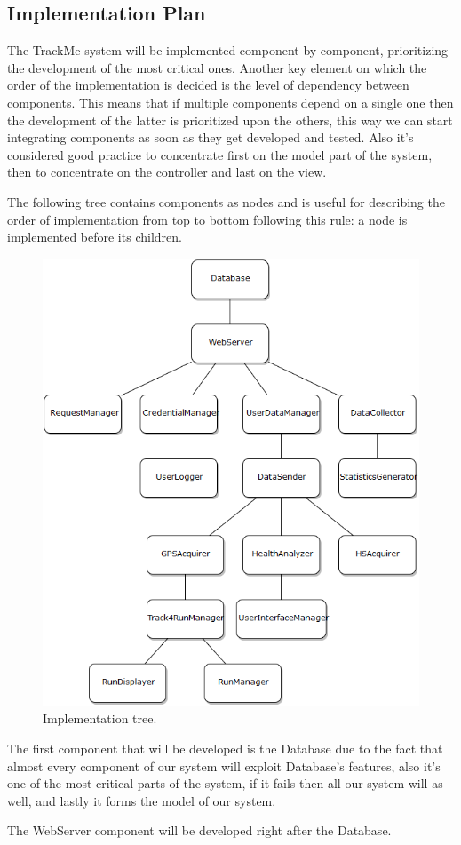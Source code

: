 \subsection{Implementation Plan}
The TrackMe system will be implemented component by component, prioritizing the development of the most critical ones. Another key element on which the order of the implementation is decided is the level of dependency between components. This means that if multiple components depend on a single one then the development of the latter is prioritized upon the others, this way we can start integrating components as soon as they get developed and tested. Also it's considered good practice to concentrate first on the model part of the system, then to concentrate on the controller and last on the view.

The following tree contains components as nodes and is useful for describing the order of implementation from top to bottom following this rule: a node is implemented before its children.

\begin{figure}[H]
\centering
\includegraphics[scale=0.5]{Images/ImplementationPlan.png}
\caption{Implementation tree.}
\end{figure}

The first component that will be developed is the Database due to the fact that almost every component of our system will exploit Database's features, also it's one of the most critical parts of the system, if it fails then all our system will as well, and lastly it forms the model of our system.

The WebServer component will be developed right after the Database.




